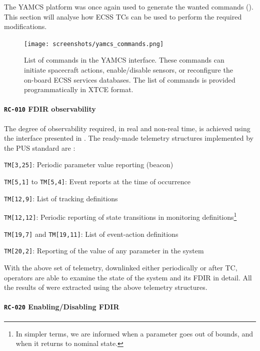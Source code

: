 \documentclass[a4paper,nobib]{tufte-book}
\begin{document}
The \ac{YAMCS} platform was once again used to generate the wanted commands (). This section will analyse how \acs{ECSS} \acsp{TC} can be used to perform the required modifications.

\begin{figure}[h]
	\texttt{[image: screenshots/yamcs\_commands.png]}
	\caption[List of commands in the YAMCS interface]{List of commands in the \acs{YAMCS} interface. These commands can initiate spacecraft actions, enable/disable sensors, or reconfigure the on-board \acs{ECSS} services databases. The list of commands is provided programmatically in \ac{XTCE} format.}
	\label{fig:yamcs_commands}
\end{figure}


\paragraph{\textbf{\texttt{RC-010} \acs{FDIR} observability}}
The degree of observability required, in real and non-real time, is achieved using the interface presented in . The ready-made telemetry structures implemented by the \acs{PUS} standard are \autocite{ECSS-E-ST-70-41C}:
\begin{compactitem}
	\item \texttt{TM[3,25]}: Periodic parameter value reporting (beacon)
	\item \texttt{TM[5,1]} to \texttt{TM[5,4]}: Event reports at the time of occurrence
	\item \texttt{TM[12,9]}: List of tracking definitions
	\item \texttt{TM[12,12]}: Periodic reporting of state transitions in monitoring definitions\footnote{In simpler terms, we are informed when a parameter goes out of bounds, and when it returns to nominal state.}
	\item \texttt{TM[19,7]} and \texttt{TM[19,11]}: List of event-action definitions
	\item \texttt{TM[20,2]}: Reporting of the value of any parameter in the system
\end{compactitem}

With the above set of telemetry, downlinked either periodically or after \acs{TC}, operators are able to examine the state of the system and its \acs{FDIR} in detail. All the results of  were extracted using the above telemetry structures.

\paragraph{\textbf{\texttt{RC-020} Enabling/Disabling \acs{FDIR}}}
\end{document}
